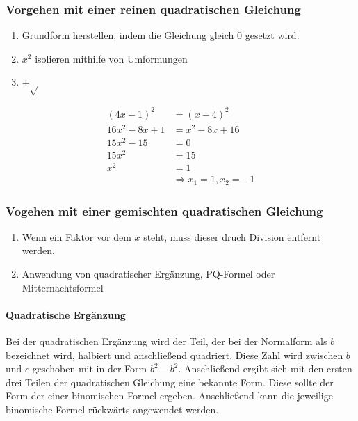 \subsubsection{Vorgehen mit einer reinen quadratischen Gleichung}
\begin{enumerate}
	\item Grundform herstellen, indem die Gleichung gleich $0$ gesetzt wird.
	\item $x^2$ isolieren mithilfe von Umformungen
	\item $\pm\sqrt{}$
\end{enumerate}
\begin{beispiel}
	\begin{align*}
		(4x-1)^2&=(x-4)^2\\
		16x^2-8x+1&=x^2-8x+16\\
		15x^2-15&=0\\
		15x^2&=15\\
		x^2&=1\\
		&\Rightarrow x_1=1, x_2=-1
	\end{align*}
\end{beispiel}
\subsubsection{Vogehen mit einer gemischten quadratischen Gleichung}
\begin{enumerate}
	\item Wenn ein Faktor vor dem $x$ steht, muss dieser druch Division entfernt werden. 
	\item Anwendung von quadratischer Ergänzung, PQ-Formel oder Mitternachtsformel
\end{enumerate}
\paragraph{Quadratische Ergänzung} Bei der quadratischen Ergänzung wird der Teil, der bei der Normalform als $b$ bezeichnet wird, halbiert und anschließend quadriert. Diese Zahl wird zwischen $b$ und $c$ geschoben mit in der Form $b^2-b^2$. Anschließend ergibt sich mit den ersten drei Teilen der quadratischen Gleichung eine bekannte Form. Diese sollte der Form der einer binomischen Formel ergeben. Anschließend kann die jeweilige binomische Formel rückwärts angewendet werden. 


